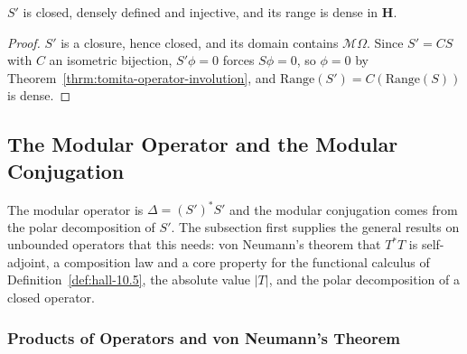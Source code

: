 \begin{corollary}[Properties of $S'$]
    \label{crllr:linearized-tomita-properties}
    \leanok
    $S'$ is closed, densely defined and injective, and its range is dense in $\mathbf{H}$.
\end{corollary}
\begin{proof}
    \leanok
    $S'$ is a closure, hence closed, and its domain contains $\mathcal{M}\Omega$. Since $S' = CS$ with $C$ an isometric bijection, $S'\phi = 0$ forces $S\phi = 0$, so $\phi = 0$ by Theorem~\ref{thrm:tomita-operator-involution}, and $\text{Range}(S') = C(\text{Range}(S))$ is dense.
\end{proof}

\subsection{The Modular Operator and the Modular Conjugation}\label{sbsctn:modular-operator-conjugation}

The modular operator is $\Delta = (S')^*S'$ and the modular conjugation comes from the polar decomposition of $S'$. The subsection first supplies the general results on unbounded operators that this needs: von Neumann's theorem that $T^*T$ is self-adjoint, a composition law and a core property for the functional calculus of Definition~\ref{def:hall-10.5}, the absolute value $|T|$, and the polar decomposition of a closed operator.

\subsubsection{Products of Operators and von Neumann's Theorem}

